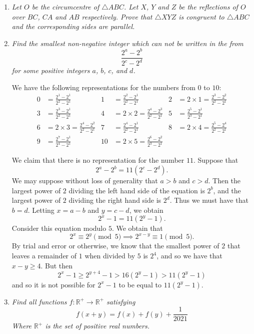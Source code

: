 \documentclass{article}
\begin{document}
\begin{enumerate}[1.]
\item %
{\itshape Let $O$ be the circumcentre of $\triangle ABC$. Let $X$, $Y$ and $Z$ be the reflections of $O$ over $BC$, $CA$ and $AB$ respectively. Prove that $\triangle XYZ$ is congruent to $\triangle ABC$ and the corresponding sides are parallel.}


\item %
{\itshape Find the smallest non-negative integer which can not be written in the from
\[
  \frac{2^a - 2^b}{2^c - 2^d}
\]
for some positive integers $a$, $b$, $c$, and $d$.}

We have the following representations for the numbers from $0$ to $10$:
\begin{align*}
  0 & = \frac{2^1 - 2^1}{2^2 - 2^1} & 1 & = \frac{2^2 - 2^1}{2^2 - 2^1} & 2 & = 2 \times 1 = \frac{2^3 - 2^2}{2^2 - 2^1} \\
  3 & = \frac{2^3 - 2^1}{2^2 - 2^1} & 4 & = 2 \times 2 = \frac{2^4 - 2^3}{2^2 - 2^1} & 5 & = \frac{2^5 - 2^1}{2^3 - 2^1} \\
  6 & = 2 \times 3 = \frac{2^4 - 2^2}{2^2 - 2^1} & 7 & = \frac{2^4 - 2^1}{2^2 - 2^1} & 8 & = 2 \times 4 = \frac{2^5 - 2^4}{2^2 - 2^1} \\
  9 & = \frac{2^7 - 2^1}{2^4 - 2^1} & 10 & = 2 \times 5 = \frac{2^6 - 2^2}{2^3 - 2^1} & &
\end{align*}

We claim that there is no representation for the number $11$. Suppose that
\[
  2^a - 2^b = 11(2^c - 2^d).
\]
We may suppose without loss of generality that $a > b$ and $c > d$. Then the largest power of $2$ dividing the left hand side of the equation is $2^b$, and the largest power of $2$ dividing the right hand side is $2^d$. Thus we must have that $b = d$. Letting $x = a - b$ and $y = c - d$, we obtain
\[
  2^x - 1 = 11(2^y - 1).
\]
Consider this equation modulo $5$. We obtain that
\[
  2^x \equiv 2^y \pmod 5 \implies 2^{x - y} \equiv 1 \pmod 5.
\]
By trial and error or otherwise, we know that the smallest power of $2$ that leaves a remainder of $1$ when divided by $5$ is $2^4$, and so we have that $x - y \geq 4$. But then
\[
  2^x - 1 \geq 2^{y + 4} - 1 > 16(2^y - 1) > 11(2^y - 1)
\]
and so it is not possible for $2^x - 1$ to be equal to $11(2^y - 1)$.


\item %
{\itshape Find all functions $f: \mathbb{R}^+ \rightarrow \mathbb{R}^+$ satisfying 
$$f(x + y) = f(x) + f(y) + \frac{1}{2021} $$
Where $\mathbb{R}^+$ is the set of positive real numbers. }


\end{enumerate}
\end{document}
